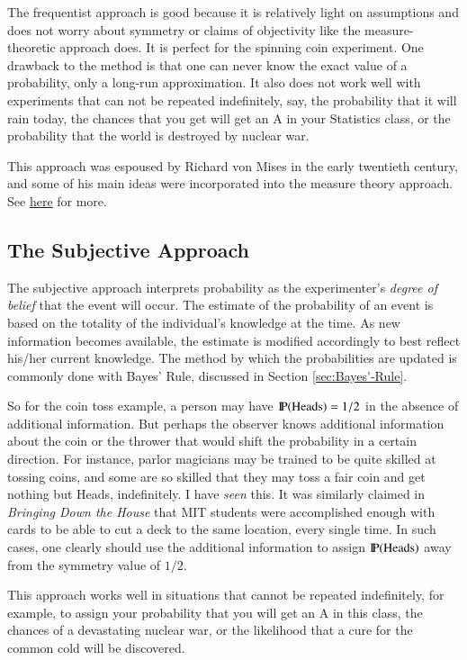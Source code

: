 \documentclass[captions=tableheading]{scrbook}
\begin{document}
The frequentist approach is good because it is relatively light on assumptions and does not worry about symmetry or claims of objectivity like the measure-theoretic approach does. It is perfect for the spinning coin experiment. One drawback to the method is that one can never know the exact value of a probability, only a long-run approximation. It also does not work well with experiments that can not be repeated indefinitely, say, the probability that it will rain today, the chances that you get will get an A in your Statistics class, or the probability that the world is destroyed by nuclear war.

This approach was espoused by Richard von Mises in the early twentieth century, and some of his main ideas were incorporated into the measure theory approach. See \href{http://www-history.mcs.st-andrews.ac.uk/Biographies/Mises.html}{here} for more.
\subsection{The Subjective Approach}
\label{sec-3-3-3}


The subjective approach interprets probability as the experimenter's \emph{degree of belief} that the event will occur. The estimate of the probability of an event is based on the totality of the individual's knowledge at the time. As new information becomes available, the estimate is modified accordingly to best reflect his/her current knowledge. The method by which the probabilities are updated is commonly done with Bayes' Rule, discussed in Section \ref{sec:Bayes'-Rule}. 

So for the coin toss example, a person may have \(\P(\mbox{Heads})=1/2\) in the absence of additional information. But perhaps the observer knows additional information about the coin or the thrower that would shift the probability in a certain direction. For instance, parlor magicians may be trained to be quite skilled at tossing coins, and some are so skilled that they may toss a fair coin and get nothing but Heads, indefinitely. I have \emph{seen} this. It was similarly claimed in \emph{Bringing Down the House} \cite{Mezrich2003} that MIT students were accomplished enough with cards to be able to cut a deck to the same location, every single time. In such cases, one clearly should use the additional information to assign \(\P(\mbox{Heads})\) away from the symmetry value of \(1/2\).

This approach works well in situations that cannot be repeated indefinitely, for example, to assign your probability that you will get an A in this class, the chances of a devastating nuclear war, or the likelihood that a cure for the common cold will be discovered.
\end{document}
